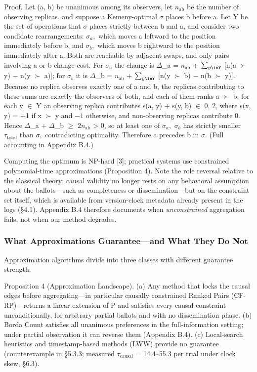 \documentclass[journal]{IEEEtran}
\begin{document}
Proof. Let (a, b) be unanimous among its observers, let $n_{\mathrm{ab}}$ be the number of observing replicas, and suppose a Kemeny-optimal $\sigma$ places b before a. Let Y be the set of operations that $\sigma$ places strictly between b and a, and consider two candidate rearrangements: $\sigma_{a},$ which moves a leftward to the position immediately before b, and $\sigma_{b},$ which moves b rightward to the position immediately after a. Both are reachable by adjacent swaps, and only pairs involving a or b change cost. For $\sigma_{a}$ the change is $\Delta$\_a = $n_{\mathrm{ab}}$ + $\sum_{y\inY}$ [n(a $\succ$ y) $-$ n(y $\succ$ a)]; for $\sigma_{b}$ it is $\Delta$\_b = $n_{\mathrm{ab}}$ + $\sum_{y\inY}$ [n(y $\succ$ b) $-$ n(b $\succ$ y)]. Because no replica observes exactly one of a and b, the replicas contributing to these sums are exactly the observers of both, and each of them ranks a $\succ$ b; for each y $\in$ Y an observing replica contributes s(a, y) + s(y, b) $\in$ {0, 2}, where s(x, y) = +1 if x $\succ$ y and $-1$ otherwise, and non-observing replicas contribute 0. Hence $\Delta$\_a + $\Delta$\_b $\geq$ $2n_{\mathrm{ab}}$ > 0, so at least one of $\sigma_{a},$ $\sigma_{b}$ has strictly smaller $\tau_{\mathrm{total}}$ than $\sigma,$ contradicting optimality. Therefore a precedes b in $\sigma.$ (Full accounting in Appendix B.4.)

Computing the optimum is NP-hard [3]; practical systems use constrained polynomial-time approximations (Proposition 4). Note the role reversal relative to the classical theory: causal validity no longer rests on any behavioral assumption about the ballots—such as completeness or dissemination—but on the constraint set itself, which is available from version-clock metadata already present in the logs (§4.1). Appendix B.4 therefore documents when \emph{unconstrained} aggregation fails, not when our method degrades.

\subsubsection{What Approximations Guarantee—and What They Do Not}
Approximation algorithms divide into three classes with different guarantee strength:

Proposition 4 (Approximation Landscape). (a) Any method that locks the causal edges before aggregating—in particular causally constrained Ranked Pairs (CF-RP)—returns a linear extension of P and satisfies every causal constraint unconditionally, for arbitrary partial ballots and with no dissemination phase. (b) Borda Count satisfies all unanimous preferences in the full-information setting; under partial observation it can reverse them (Appendix B.4). (c) Local-search heuristics and timestamp-based methods (LWW) provide no guarantee (counterexample in §5.3.3; measured $\tau_{\mathrm{causal}}$ = 14.4–55.3 per trial under clock skew, §6.3).
\end{document}
